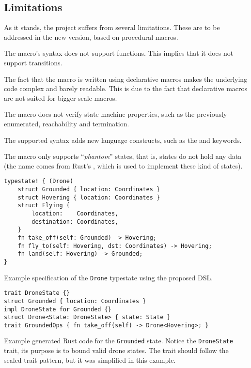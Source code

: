 \subsection{Limitations}

As it stands, the project suffers from several limitations.
These are to be addressed in the new version, based on procedural macros.
\begin{compactitem}
    \item The macro's syntax does not support functions. This implies that it does not support transitions.
    \item The fact that the macro is written using declarative macros makes the underlying code complex and barely readable.
    This is due to the fact that declarative macros are not suited for bigger scale macros.
    \item The macro does not verify state-machine properties, such as the previously enumerated, reachability and termination.
    \item The supported syntax adds new language constructs, such as the  and  keywords.
    \item The macro only supports “\emph{phantom}” states, that is, states do not hold any data
    (the name comes from Rust's , which is used to implement these kind of states).
\end{compactitem}






\begin{listing}
    \centering
    \begin{verbatim}
typestate! { (Drone)
    struct Grounded { location: Coordinates }
    struct Hovering { location: Coordinates }
    struct Flying {
        location:    Coordinates,
        destination: Coordinates,
    }
    fn take_off(self: Grounded) -> Hovering;
    fn fly_to(self: Hovering, dst: Coordinates) -> Hovering;
    fn land(self: Hovering) -> Grounded;
}
\end{verbatim}
\caption{
    Example specification of the \texttt{Drone} typestate using the proposed DSL.
}
    \label{lst:dsl-typestate-spec}
\end{listing}


\begin{listing}
    \centering
    \begin{verbatim}
trait DroneState {}
struct Grounded { location: Coordinates }
impl DroneState for Grounded {}
struct Drone<State: DroneState> { state: State }
trait GroundedOps { fn take_off(self) -> Drone<Hovering>; }
    \end{verbatim}
    \caption{
        Example generated Rust code for the \texttt{Grounded} state.
        Notice the \texttt{DroneState} trait, its purpose is to bound valid drone states.
        The trait should follow the sealed trait pattern, but it was simplified in this example.
    }
    \label{lst:dsl-typestate-generated}
\end{listing}



